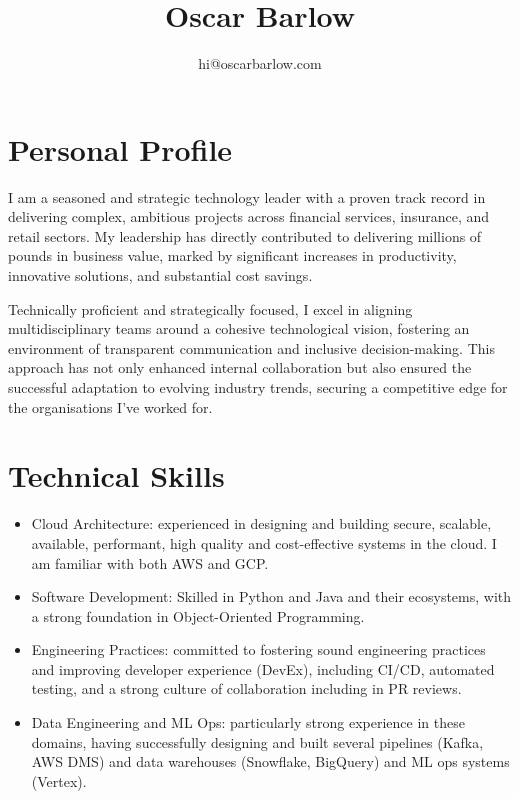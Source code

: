 \documentclass[a4paper]{scrartcl}
\date{}
\begin{document}
\title{Oscar Barlow}
\subtitle{hi@oscarbarlow.com}
\maketitle

\section*{Personal Profile}
I am a seasoned and strategic technology leader with a proven track record in
delivering complex, ambitious projects across financial services, insurance,
and retail sectors. My leadership has directly contributed to delivering
millions of pounds in business value, marked by significant increases in
productivity, innovative solutions, and substantial cost savings.

Technically proficient and strategically focused, I excel in aligning
multidisciplinary
teams around a cohesive technological vision, fostering an environment of
transparent communication and inclusive decision-making. This approach has not
only enhanced internal collaboration but also ensured the successful adaptation
to evolving industry trends, securing a competitive edge for the organisations
I've worked for.

\section*{Technical Skills}
\begin{itemize}
      \item Cloud Architecture: experienced in designing and building secure,
            scalable, available, performant, high quality and cost-effective
            systems in the
            cloud. I am familiar with both AWS and GCP.
      \item Software Development: Skilled in Python and Java and their
            ecosystems, with a
            strong foundation in Object-Oriented Programming.
      \item Engineering Practices: committed to fostering sound engineering
            practices and improving developer experience (DevEx), including
            CI/CD,
            automated testing, and a strong culture of collaboration including
            in PR
            reviews.
      \item Data Engineering and ML Ops: particularly strong experience in
            these domains, having successfully designing and built several
            pipelines (Kafka, AWS DMS) and data warehouses (Snowflake, BigQuery)
            and ML ops systems (Vertex).
\end{itemize}
\end{document}
